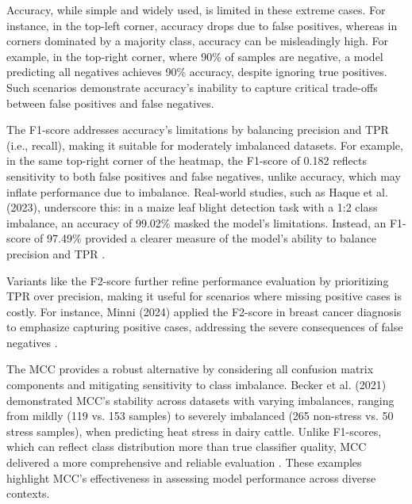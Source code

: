 Accuracy, while simple and widely used, is limited in these extreme cases. For instance, in the top-left corner, accuracy drops due to false positives, whereas in corners dominated by a majority class, accuracy can be misleadingly high. For example, in the top-right corner, where 90\% of samples are negative, a model predicting all negatives achieves 90\% accuracy, despite ignoring true positives. Such scenarios demonstrate accuracy’s inability to capture critical trade-offs between false positives and false negatives.

The F1-score addresses accuracy’s limitations by balancing precision and TPR (i.e., recall), making it suitable for moderately imbalanced datasets. For example, in the same top-right corner of the heatmap, the F1-score of 0.182 reflects sensitivity to both false positives and false negatives, unlike accuracy, which may inflate performance due to imbalance. Real-world studies, such as Haque et al. (2023), underscore this: in a maize leaf blight detection task with a 1:2 class imbalance, an accuracy of 99.02\% masked the model’s limitations. Instead, an F1-score of 97.49\% provided a clearer measure of the model’s ability to balance precision and TPR \citep{haque_recognition_2023}.

Variants like the F2-score further refine performance evaluation by prioritizing TPR over precision, making it useful for scenarios where missing positive cases is costly. For instance, Minni (2024) applied the F2-score in breast cancer diagnosis to emphasize capturing positive cases, addressing the severe consequences of false negatives \citep{minni_exploring_2024}.

The MCC provides a robust alternative by considering all confusion matrix components and mitigating sensitivity to class imbalance. Becker et al. (2021) demonstrated MCC’s stability across datasets with varying imbalances, ranging from mildly (119 vs. 153 samples) to severely imbalanced (265 non-stress vs. 50 stress samples), when predicting heat stress in dairy cattle. Unlike F1-scores, which can reflect class distribution more than true classifier quality, MCC delivered a more comprehensive and reliable evaluation \citep{becker_predicting_2021}. These examples highlight MCC’s effectiveness in assessing model performance across diverse contexts.
